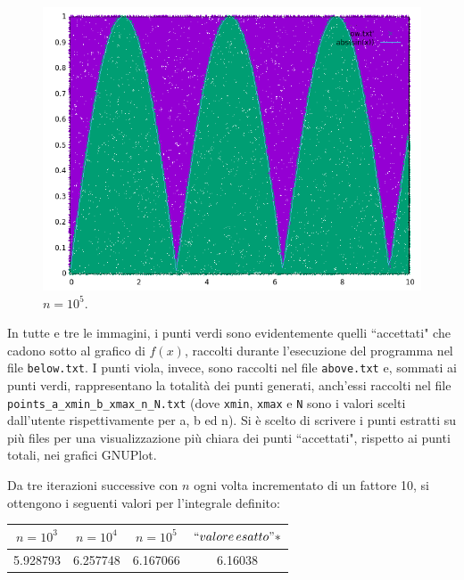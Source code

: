 \documentclass[a4paper, 12pt, oneside]{article}
\begin{document}
		\begin{figure}[!htb]
			\centering
			\begin{minipage}{0.45\textwidth}
				\includegraphics[width=1\linewidth]{n100000.png}
				\caption{$n = 10^5$.}
				\label{n100000}
			\end{minipage}
		\end{figure}
	
	In tutte e tre le immagini, i punti verdi sono evidentemente quelli ``accettati" che cadono sotto al grafico di $f(x)$, raccolti durante l'esecuzione del programma nel file \texttt{below.txt}. I punti viola, invece, sono raccolti nel file \texttt{above.txt} e, sommati ai punti verdi, rappresentano la totalità dei punti generati, anch'essi raccolti nel file \texttt{points\_a\_xmin\_b\_xmax\_n\_N.txt} (dove \texttt{xmin}, \texttt{xmax} e \texttt{N} sono i valori scelti dall'utente rispettivamente per a, b ed n). Si è scelto di scrivere i punti estratti su più files per una visualizzazione più chiara dei punti ``accettati", rispetto ai punti totali, nei grafici GNUPlot.
	
	Da tre iterazioni successive con $n$ ogni volta incrementato di un fattore 10, si ottengono i seguenti valori per l'integrale definito:
	\begin{center}
		\begin{tabular}{|c|c|c|c|}
			\hline
			$n = 10^3$ & $n = 10^4$ & $n = 10^5$ & $``valore\,esatto"*$ \\
			\hline
			5.928793 & 6.257748 & 6.167066 & 6.16038\\
			\hline
		\end{tabular}		
	\end{center}
	
\end{document}
